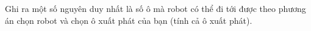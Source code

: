Ghi ra một số nguyên duy nhất là số ô mà robot có thể đi tới được theo phương án chọn robot và chọn ô xuất phát của bạn (tính cả ô xuất phát).